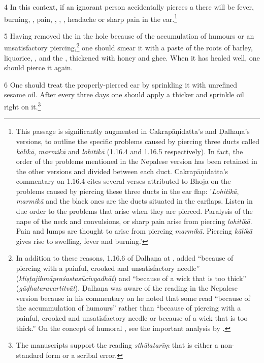 \begin{translation}
    \item [4] In this context, if an ignorant person accidentally pierces a
 there will be fever, burning, , pain,
, ,
, headache or sharp pain in the ear.\footnote{This
    passage is significantly augmented in Cakrapāṇidatta's and Ḍalhaṇa's versions,
    to outline the specific problems caused by piercing three ducts called
    \emph{kālikā}, \emph{marmikā} and \emph{lohitikā} (1.16.4
    \citep[126]{acar-1939} and 1.16.5 \citep[77]{vulgate} respectively). In fact,
    the order of the problems mentioned in the Nepalese version has been retained
    in the other versions and divided between each duct. Cakrapāṇidatta's
    commentary on 1.16.4 \citep[126]{acar-1939} cites several verses attributed to
    Bhoja on the problems caused by piercing these three ducts in the ear flap:
    '\emph{Lohitikā}, \emph{marmikā} and the black ones are the ducts situated in
    the earflaps.  Listen in due order to the problems that arise when they are
    pierced. Paralysis of the nape of the neck and convulsions, or sharp pain
    arise from piercing \emph{lohitikā}. Pain and lumps are thought to arise from
    piercing \emph{marmikā}. Piercing \emph{kālikā} gives rise to swelling, fever
    and burning.'}
    
    \item[5]     Having removed the  in the hole because of the
accumulation of humours or an unsatisfactory piercing,\footnote{In addition to
these reasons, 1.16.6 of Ḍalhaṇa at , added “because of
piercing with a painful, crooked and unsatisfactory needle”
(\emph{kliṣṭajihmāpraśastasūcīvyadhāt}) and  “because of a wick that is too
thick” (\emph{gāḍhataravartitvāt}). Ḍalhaṇa was aware of the reading in the
Nepalese version because in his commentary on  he noted that
some read “because of the accummulation of humours” rather than “because of
piercing with a painful, crooked and unsatisfactory needle or because of a
wick that is too thick.” On the concept of humoral
, see the important analysis by \citet{meul-1992}.}
one should smear it with a paste of the roots of barley, liquorice,
, and the ,
thickened with honey and ghee. When it has healed well, one should pierce it
again.
    
    \item[6] One should treat the properly-pierced ear by sprinkling it with
unrefined sesame oil.   After every three days one should apply a thicker
 and sprinkle oil right on it.\footnote{The manuscripts
    support the reading \emph{sthūlatarīṃ} that is either a non-standard form or a
    scribal error.}
    

\end{translation}
